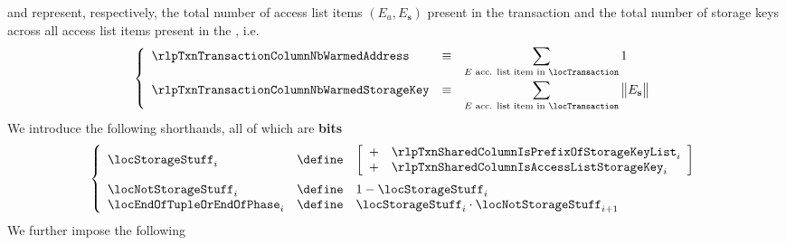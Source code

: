 	\saNote{}
	\rlpTxnTransactionColumnNbWarmedAddress    {} and
	\rlpTxnTransactionColumnNbWarmedStorageKey {}
	represent, respectively, the total number of access list items $(E _a, E _\textbf{s})$
	present in the transaction \locTransaction{}
	and
	the total number of storage keys across all access list items present in the \locTransaction{}, i.e.
	\[
		\left\{ \begin{array}{lcl}
			\rlpTxnTransactionColumnNbWarmedAddress & \equiv &
			\displaystyle \sum _{E \text{ acc. list item in } \locTransaction}
			1
			\vspace{1mm} \\
			\rlpTxnTransactionColumnNbWarmedStorageKey & \equiv &
			\displaystyle \sum _{E \text{ acc. list item in } \locTransaction}
			\big\| E _\textbf{s} \big\| \\
		\end{array} \right.
	\]
	We introduce the following shorthands, all of which are \textbf{bits}
	\[
		\left\{ \begin{array}{lcl}
			\locStorageStuff _{i} & \define &
			\left[ \begin{array}{cl}
				+ & \rlpTxnSharedColumnIsPrefixOfStorageKeyList _{i} \\
				+ & \rlpTxnSharedColumnIsAccessListStorageKey   _{i} \\
			\end{array} \right]
			\vspace{2mm}
			\\
			\locNotStorageStuff        _{i} & \define & 1 - \locStorageStuff _{i}                                \\
			\locEndOfTupleOrEndOfPhase _{i} & \define & \locStorageStuff _{i} \cdot \locNotStorageStuff _{i + 1} \\
		\end{array} \right.
	\]
	We further impose the following
